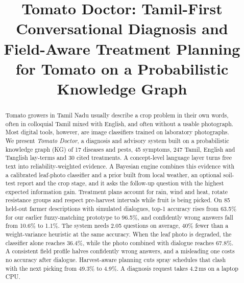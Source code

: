 \documentclass[conference]{IEEEtran}
\begin{document}
\title{Tomato Doctor: Tamil-First Conversational Diagnosis and Field-Aware Treatment Planning for Tomato on a Probabilistic Knowledge Graph}

\author{%
}

\maketitle

\begin{abstract}
Tomato growers in Tamil Nadu usually describe a crop problem in their own words, often in colloquial Tamil mixed with English, and often without a usable photograph. Most digital tools, however, are image classifiers trained on laboratory photographs. We present \emph{Tomato Doctor}, a diagnosis and advisory system built on a probabilistic knowledge graph (KG) of 17 diseases and pests, 45 symptoms, 247 Tamil, English and Tanglish lay-terms and 30 cited treatments. A concept-level language layer turns free text into reliability-weighted evidence. A Bayesian engine combines this evidence with a calibrated leaf-photo classifier and a prior built from local weather, an optional soil-test report and the crop stage, and it asks the follow-up question with the highest expected information gain. Treatment plans account for rain, wind and heat, rotate resistance groups and respect pre-harvest intervals while fruit is being picked. On 85 held-out farmer descriptions with simulated dialogues, top-1 accuracy rises from 63.5\% for our earlier fuzzy-matching prototype to 96.5\%, and confidently wrong answers fall from 10.6\% to 1.1\%. The system needs 2.05 questions on average, 40\% fewer than a weight-variance heuristic at the same accuracy. When the leaf photo is degraded, the classifier alone reaches 36.4\%, while the photo combined with dialogue reaches 67.8\%. A consistent field profile halves confidently wrong answers, and a misleading one costs no accuracy after dialogue. Harvest-aware planning cuts spray schedules that clash with the next picking from 49.3\% to 4.9\%. A diagnosis request takes 4.2\,ms on a laptop CPU.
\end{abstract}
\end{document}
